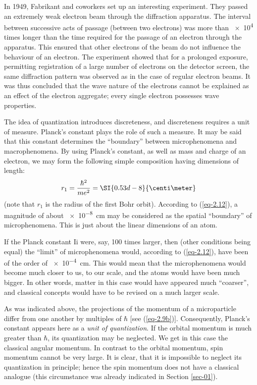 \documentclass[a4paper,sfsidenotes,colorlinks=true]{tufte-book}
\numberwithin{equation}{section}
\numberwithin{figure}{section}
\begin{document}
In 1949, Fabrikant and coworkers set up an interesting
experiment. They passed an extremely weak electron beam through the
diffraction apparatus. The interval between successive acts of passage
(between two electrons) was more than \num{e4} times longer than the
time required for the passage of an electron through the
apparatus. This ensured that other electrons of the beam do not
influence the behaviour of an electron. The experiment showed that for
a prolonged exposure, permitting registration of a large number of
electrons on the detector screen, the same diffraction pattern was
observed as in the case of regular electron beams. It was thus
concluded that the wave nature of the electrons cannot be explained as
an effect of the electron aggregate; every single electron possesses
wave properties.

The idea of quantization 
introduces discreteness, and discreteness requires a unit of
measure. Planck's constant plays the role of such a measure. It may be
said that this constant determines the ``boundary'' between
microphenomena and macrophenomena. By using Planck's constant, as well
as mass and charge of an electron, we may form the following simple
composition having dimensions of length:
\begin{equation}%
r_{1} = \frac{\hbar^{2}}{me^{2}} = \SI{0.53d-8}{\centi\meter}
\label{eq-2.12} 
\end{equation}
(note that $r_{1}$ is the radius of the first Bohr orbit). According
to (\ref{eq-2.12}), a magnitude of about \SI{e-8}{\centi\meter} may be
considered as the spatial ``boundary'' of microphenomena. This is just
about the linear dimensions of an atom.

If the Planck constant Ii were, say, 100 times larger, then (other
conditions being equal) the ``limit'' of microphenomena would,
according to (\ref{eq-2.12}), have been of the order of
\SI{e-4}{\centi\meter}. This would mean that the microphenomena
would become much closer to us, to our scale, and the atoms would have
been much bigger. In other words, matter in this case would have
appeared much ``coarser'', and classical concepts would have to be
revised on a much larger scale.

As was indicated above, the projections of the momentum of a
microparticle differ from one another by multiples of $\hbar$ [see
(\ref{eq-2.9b})]. Consequently, Planck's constant appears here as a
\emph{unit of quantization}. If the orbital momentum is much greater
than $\hbar$, its quantization may be neglected. We get in this case the
classical angular momentum. In contrast to the orbital momentum, spin
momentum cannot be very large. It is clear, that it is impossible to
neglect its quantization in principle; hence the spin momentum does
not have a classical analogue (this circumstance was already
indicated in Section \ref{sec-01}).
\end{document}
